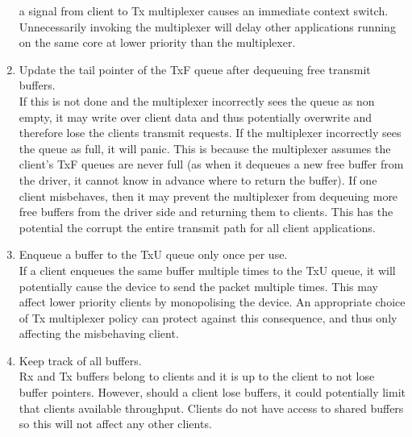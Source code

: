 \begin{enumerate}
    a signal from client to Tx multiplexer causes an immediate context switch. Unnecessarily invoking the multiplexer will delay other 
    applications running on the same core at lower priority than the multiplexer.
    \item Update the tail pointer of the TxF queue after dequeuing free transmit buffers.\\
    If this is not done and the multiplexer incorrectly sees the queue as non empty, it may write over client data and
    thus potentially overwrite and therefore lose the clients transmit requests. If
    the multiplexer incorrectly sees the queue as full, it will panic. This is because the multiplexer assumes the client's 
    TxF queues are never full (as when it dequeues a new free buffer from the driver, it cannot know in advance where 
    to return the buffer). If one client misbehaves, then it may prevent the multiplexer from dequeuing more free buffers 
    from the driver side and returning them to clients. This has the potential the corrupt the entire transmit path for all
    client applications.
    \item Enqueue a buffer to the TxU queue only once per use.\\
    If a client enqueues the same buffer multiple times to the TxU queue, it will potentially cause the device to send the
    packet multiple times. This may affect lower priority clients by monopolising the device. An appropriate choice of Tx multiplexer
    policy can protect against this consequence, and thus only affecting the misbehaving client.
    \item Keep track of all buffers.\\
    Rx and Tx buffers belong to clients and it is up to the client to not lose buffer pointers. However, should a client lose
    buffers, it could potentially limit that clients available throughput. Clients do not have access to shared buffers so this
    will not affect any other clients.
\end{enumerate}

